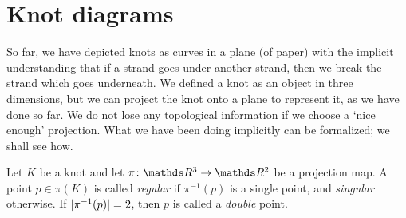 \section{Knot diagrams}

So far, we have depicted knots as curves in a plane (of paper) with the implicit understanding that if a strand goes under another strand, then we break the strand which goes underneath. We defined a knot as an object in three dimensions, but we can project the knot onto a plane to represent it, as we have done so far. We do not lose any topological information if we choose a `nice enough' projection. What we have been doing implicitly can be formalized; we shall see how.

Let \(K\) be a knot and let \(\pi \colon \rthree \rightarrow \rtwo\) be a projection map. A point \(p \in \pi(K)\) is called \textit{regular} if \(\pi^{-1}(p)\) is a single point, and \textit{singular} otherwise. If \(\lvert\pi^{-1}(p)\rvert = 2\), then \(p\) is called a \textit{double} point.


%
%
%

%
%

